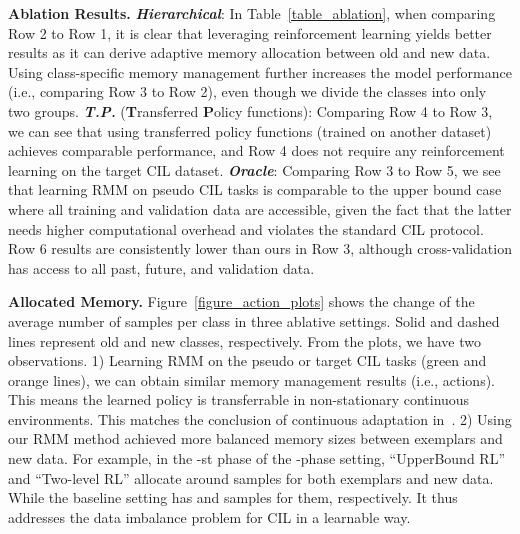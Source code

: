 \documentclass{article}
\newcommand{\myparagraph}[1]{\vspace{0.1em}\noindent\textbf{#1}}
\begin{document}
\myparagraph{Ablation Results.} \textbf{\emph{Hierarchical}}: In Table~\ref{table_ablation}, when comparing Row 2 to Row 1, it is clear that leveraging reinforcement learning yields better results as it can derive adaptive memory allocation between old and new data.
Using class-specific memory management further increases the model performance (i.e., comparing Row 3 to Row 2), even though we divide the classes into only two groups. 
\textbf{\emph{T.P.}} (\textbf{T}ransferred \textbf{P}olicy functions): 
Comparing Row 4 to Row 3, we can see that using transferred policy functions (trained on another dataset) achieves comparable performance, and Row 4 does not require any reinforcement learning on the target CIL dataset.
\textbf{\emph{Oracle}}: Comparing Row 3 to Row 5, we see that learning RMM on pseudo CIL tasks is comparable to the upper bound case where all training and validation data are accessible, given the fact that the latter needs higher computational overhead and violates the standard CIL protocol.
Row 6 results are consistently lower than ours in Row 3, although cross-validation has access to all past, future, and validation data.

\myparagraph{Allocated Memory.}
Figure~\ref{figure_action_plots} shows the change of the average number of samples per class in three ablative settings. 
Solid and dashed lines represent old and new classes, respectively.
From the plots, we have two observations. 1) Learning RMM on the pseudo or target CIL tasks (green and orange lines), we can obtain similar memory management results (i.e., actions). 
This means the learned policy is transferrable in non-stationary continuous environments.
This matches the conclusion of continuous adaptation
in~\cite{ShedivatBBSM18}.
2) Using our RMM method achieved more balanced memory sizes between exemplars and new data.
For example, in the -st phase of the -phase setting, ``UpperBound RL'' and ``Two-level RL'' allocate around  samples for both exemplars and new data. 
While the baseline setting has  and  samples for them, respectively.
It thus addresses the data imbalance problem for CIL in a learnable way.
\end{document}

